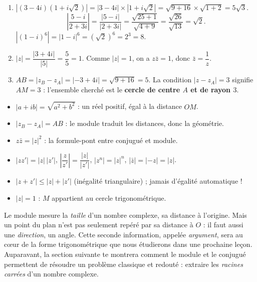 \documentclass[11pt]{article}
\begin{document}
\begin{corrige}
\begin{enumerate}
\item $\left|(3-4i)(1+i\sqrt{2})\right| = |3-4i| \times |1+i\sqrt{2}| = \sqrt{9+16} \times \sqrt{1+2} = 5\sqrt{3}$.
\[ \left|\dfrac{5-i}{2+3i}\right| = \dfrac{|5-i|}{|2+3i|} = \dfrac{\sqrt{25+1}}{\sqrt{4+9}} = \dfrac{\sqrt{26}}{\sqrt{13}} = \sqrt{2}. \]
$\left|(1-i)^6\right| = |1-i|^6 = (\sqrt{2})^6 = 2^3 = 8$.
\item $|z| = \dfrac{|3+4i|}{|5|} = \dfrac{5}{5} = 1$. Comme $|z| = 1$, on a $z\bar{z} = 1$, donc $\bar{z} = \dfrac{1}{z}$.
\item $AB = |z_B - z_A| = |-3 + 4i| = \sqrt{9+16} = 5$. La condition $|z - z_A| = 3$ signifie $AM = 3$ : l'ensemble cherché est le \textbf{cercle de centre $A$ et de rayon $3$}.
\end{enumerate}
\end{corrige}

\begin{aretenir}
\begin{itemize}
\item $|a + ib| = \sqrt{a^2+b^2}$ : un réel positif, égal à la distance $OM$.
\item $|z_B - z_A| = AB$ : le module traduit les distances, donc la géométrie.
\item $z\bar{z} = |z|^2$ : la formule-pont entre conjugué et module.
\item $|zz'| = |z|\,|z'|$, $\left|\dfrac{z}{z'}\right| = \dfrac{|z|}{|z'|}$, $|z^n| = |z|^n$, $|\bar{z}| = |-z| = |z|$.
\item $|z + z'| \leq |z| + |z'|$ (inégalité triangulaire) ; jamais d'égalité automatique !
\item $|z| = 1$ : $M$ appartient au cercle trigonométrique.
\end{itemize}
\end{aretenir}

Le module mesure la \emph{taille} d'un nombre complexe, sa distance à l'origine. Mais un point du plan n'est pas seulement repéré par sa distance à $O$ : il faut aussi une \emph{direction}, un angle. Cette seconde information, appelée \emph{argument}, sera au cœur de la forme trigonométrique que nous étudierons dans une prochaine leçon. Auparavant, la section suivante te montrera comment le module et le conjugué permettent de résoudre un problème classique et redouté : extraire les \emph{racines carrées} d'un nombre complexe.
\end{document}
